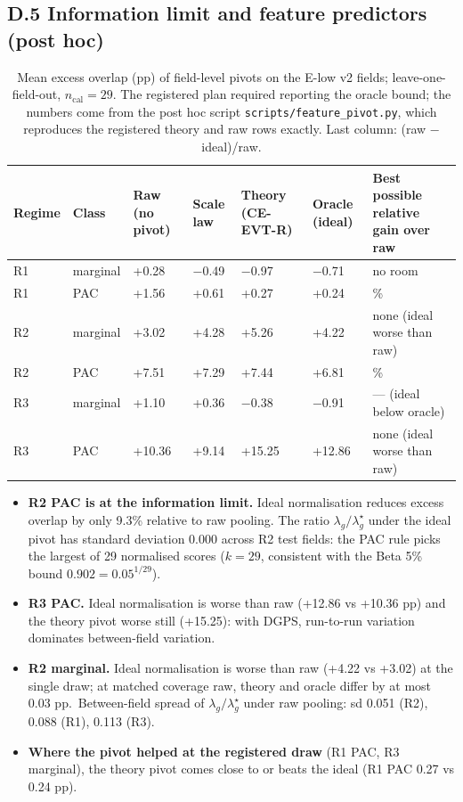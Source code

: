 \documentclass[preprint,12pt,authoryear]{elsarticle}
\providecommand{\tightlist}{\setlength{\itemsep}{0pt}\setlength{\parskip}{0pt}}
\begin{document}
\subsection*{D.5 Information limit and feature predictors (post hoc)}

\begin{table}[!htbp]
\centering
\footnotesize
\renewcommand{\thetable}{S12}\caption{Mean excess overlap (pp) of field-level pivots on the E-low v2 fields; leave-one-field-out, \(n_\mathrm{cal}=29\). The registered plan required reporting the oracle bound; the numbers come from the post hoc script \texttt{scripts/feature\_pivot.py}, which reproduces the registered theory and raw rows exactly. Last column: (raw − ideal)/raw.}
\begin{tabularx}{\textwidth}{@{}llll>{\raggedright\arraybackslash\hsize=0.68\hsize}Xl>{\raggedright\arraybackslash\hsize=1.32\hsize}X@{}}
\toprule
\textbf{Regime} & \textbf{Class} & \textbf{Raw (no pivot)} & \textbf{Scale law} & \textbf{Theory (CE-EVT-R)} & \textbf{Oracle (ideal)} & \textbf{Best possible relative gain over raw} \\
\midrule
R1 & marginal & +0.28 & −0.49 & −0.97 & −0.71 & no room \\
R1 & PAC & +1.56 & +0.61 & +0.27 & +0.24 & 84.6\% \\
R2 & marginal & +3.02 & +4.28 & +5.26 & +4.22 & none (ideal worse than raw) \\
R2 & PAC & +7.51 & +7.29 & +7.44 & +6.81 & 9.3\% \\
R3 & marginal & +1.10 & +0.36 & −0.38 & −0.91 & --- (ideal below oracle) \\
R3 & PAC & +10.36 & +9.14 & +15.25 & +12.86 & none (ideal worse than raw) \\
\bottomrule
\end{tabularx}
\end{table}

\begin{itemize}
\tightlist
\item
  \textbf{R2 PAC is at the information limit.} Ideal normalisation reduces excess overlap by only 9.3\% relative to raw pooling. The ratio \(\lambda_g/\lambda^\star_g\) under the ideal pivot has standard deviation 0.000 across R2 test fields: the PAC rule picks the largest of 29 normalised scores (\(k=29\), consistent with the Beta 5\% bound \(0.902=0.05^{1/29}\)).
\item
  \textbf{R3 PAC.} Ideal normalisation is worse than raw (+12.86 vs +10.36 pp) and the theory pivot worse still (+15.25): with DGPS, run-to-run variation dominates between-field variation.
\item
  \textbf{R2 marginal.} Ideal normalisation is worse than raw (+4.22 vs +3.02) at the single draw; at matched coverage raw, theory and oracle differ by at most 0.03 pp.~Between-field spread of \(\lambda_g/\lambda^\star_g\) under raw pooling: sd 0.051 (R2), 0.088 (R1), 0.113 (R3).
\item
  \textbf{Where the pivot helped at the registered draw} (R1 PAC, R3 marginal), the theory pivot comes close to or beats the ideal (R1 PAC 0.27 vs 0.24 pp).
\end{itemize}
\end{document}
